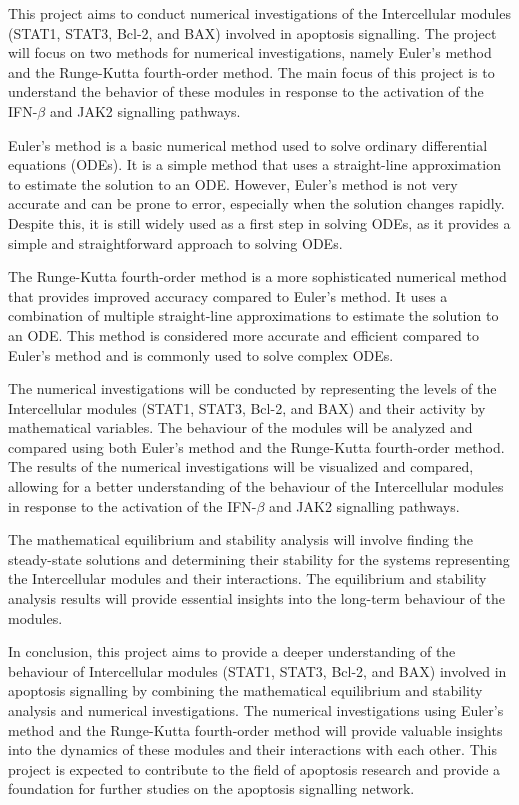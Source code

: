 This project aims to conduct numerical investigations of the Intercellular modules (STAT1, STAT3, Bcl-2, and BAX) involved in apoptosis signalling. The project will focus on two methods for numerical investigations, namely Euler's method and the Runge-Kutta fourth-order method. The main focus of this project is to understand the behavior of these modules in response to the activation of the IFN-$\beta$ and JAK2 signalling pathways.

Euler's method is a basic numerical method used to solve ordinary differential equations (ODEs). It is a simple method that uses a straight-line approximation to estimate the solution to an ODE. However, Euler's method is not very accurate and can be prone to error, especially when the solution changes rapidly. Despite this, it is still widely used as a first step in solving ODEs, as it provides a simple and straightforward approach to solving ODEs.

The Runge-Kutta fourth-order method is a more sophisticated numerical method that provides improved accuracy compared to Euler's method. It uses a combination of multiple straight-line approximations to estimate the solution to an ODE. This method is considered more accurate and efficient compared to Euler's method and is commonly used to solve complex ODEs.

The numerical investigations will be conducted by representing the levels of the Intercellular modules (STAT1, STAT3, Bcl-2, and BAX) and their activity by mathematical variables. The behaviour of the modules will be analyzed and compared using both Euler's method and the Runge-Kutta fourth-order method. The results of the numerical investigations will be visualized and compared, allowing for a better understanding of the behaviour of the Intercellular modules in response to the activation of the IFN-$\beta$ and JAK2 signalling pathways.

The mathematical equilibrium and stability analysis will involve finding the steady-state solutions and determining their stability for the systems representing the Intercellular modules and their interactions. The equilibrium and stability analysis results will provide essential insights into the long-term behaviour of the modules.

In conclusion, this project aims to provide a deeper understanding of the behaviour of Intercellular modules (STAT1, STAT3, Bcl-2, and BAX) involved in apoptosis signalling by combining the mathematical equilibrium and stability analysis and numerical investigations. The numerical investigations using Euler's method and the Runge-Kutta fourth-order method will provide valuable insights into the dynamics of these modules and their interactions with each other. This project is expected to contribute to the field of apoptosis research and provide a foundation for further studies on the apoptosis signalling network.



